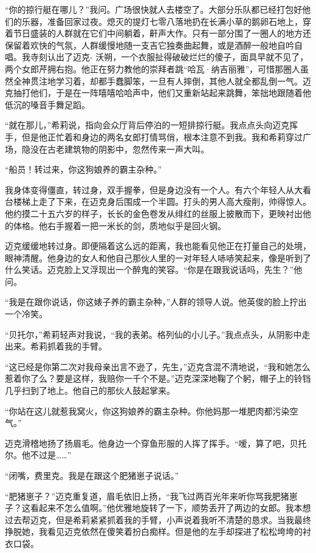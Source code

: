 \documentclass[AutoFakeBold=true]{book}
\begin{document}
``你的掠行艇在哪儿？''我问。广场很快就人去楼空了。大部分乐队都已经打包好他们的乐器，准备回家过夜。熄灭的提灯七零八落地扔在长满小草的鹅卵石地上，穿着节日盛装的人群就在它们中间躺着，鼾声大作。只有一部分围了一圈人的地方还保留着欢快的气氛，人群缓慢地随一支吉它独奏曲起舞，或是酒醉一般地自吟自唱。我寺刻认出了迈克- 沃朔，一个衣服扯得破破烂烂的傻子，面具早就不见了，两个女郎芹拥右抱。他正在努力教他的崇拜者跳``哈瓦·纳吉丽雅''，可惜那圈人虽然全神贯注地学习着，却都手蠢脚笨，一旦有人摔倒，其他人就全都乱倒一气。迈克抽打他们，于是在一阵嘻嘻哈哈声中，他们又重新站起来跳舞，笨拙地跟随着他低沉的嗓音手舞足蹈。

``就在那儿，''希莉说，指向会众厅背后停泊的一短排掠行艇。我点点头向迈克挥手，但是他正忙着和身边的两名女郎打情骂俏，根本注意不到我。我和希莉穿过广场，隐没在古老建筑物的阴影中，忽然传来一声大叫。

``船员！转过来，你这狗娘养的霸主杂种。''

我身体变得僵直，转过身，双手握拳，但是身边没有一个人。有六个年轻人从大看台楼梯上走了下来，在迈克身后围成一个半圆。打头的男人高大瘦削，帅得惊人。他约摸二十五六岁的样子，长长的金色卷发从绯红的丝服上披散而下，更映衬出他的体格。他右手握着一把一米长的剑，质地似乎是回火钢。

迈克缓缓地转过身。即便隔着这么远的距离，我也能看见他正在打量自己的处境，眼神清醒。他身边的女人和他自己那伙人里的一对年轻人哧哧笑起来，像是听到了什么笑话。迈克脸上又浮现出一个醉鬼的笑容。``你是在跟我说话吗，先生？''他问。

``我是在跟你说话，你这婊子养的霸主杂种，''人群的领导人说。他英俊的脸上拧出一个冷笑。

``贝托尔，''希莉轻声对我说，``我的表弟。格列仙的小儿子。''我点点头，从阴影中走出来。希莉抓着我的手臂。

``这已经是你第二次对我母亲出言不逊了，先生，''迈克含混不清地说，``我和她怎么惹着你了么？要是这样，我赔你一千个不是。''迈克深深地鞠了个躬，帽子上的铃铛几乎扫到了地上。他自己的那伙人鼓起掌来。

``你站在这儿就惹我窝火，你这狗娘养的霸主杂种。你他妈那一堆肥肉都污染空气。''

迈克滑稽地扬了扬眉毛。他身边一个穿鱼形服的人挥了挥手。``嗳，算了吧，贝托尔。他不过是……''

``闭嘴，费里克。我是在跟这个肥猪崽子说话。''

``肥猪崽子？''迈克重复道，眉毛依旧上扬，``我飞过两百光年来听你骂我肥猪崽子？这看起来不怎么值啊。''他优雅地旋转了一下，顺势丢开了两边的女郎。我本想过去帮迈克，但是希莉紧紧抓着我的手臂，小声说着我听不清楚的恳求。当我最终挣脱她，我看见迈克依然在傻笑着扮白痴样。但是他的左手却探进了松松垮垮的衬衣口袋。
\end{document}
